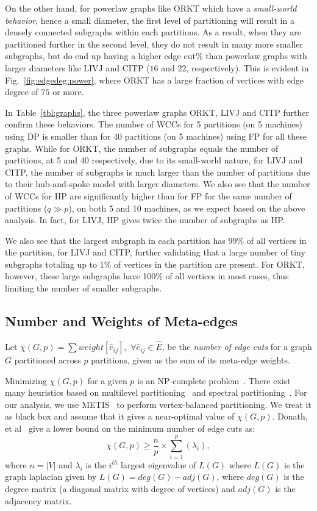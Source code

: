 \documentclass[10pt,conference, compsocconf]{IEEEtran}
\begin{document}
On the other hand, for powerlaw graphs like ORKT which have a \emph{small-world behavior}, hence a small diameter, the first level of partitioning will result in a densely connected subgraphs within each partitions. As a result, when they are partitioned further in the second level, they do not result in many more smaller subgraphs, but do end up having a higher edge cut\% than powerlaw graphs with larger diameters like LIVJ and CITP  ($16$ and $22$, respectively). This is evident in Fig.~\ref{fig:edgedeg:power}, where ORKT has a large fraction of vertices with edge degree of $75$ or more.



In Table~\ref{tbl:graphs}, the three powerlaw graphs ORKT, LIVJ and CITP further confirm these behaviors. The number of WCCs for 5 partitions (on 5 machines) using DP is smaller than for 40 partitions (on 5 machines) using FP for all these graphs. While for ORKT, the number of subgraphs equals the number of partitions, at 5 and 40 respectively, due to its small-world nature, for LIVJ and CITP, the number of subgraphs is much larger than the number of partitions due to their hub-and-spoke model with larger diameters. We also see that the number of WCCs for HP are significantly higher than for FP for the same number of partitions ($q\gg p$), on both 5 and 10 machines, as we expect based on the above analysis. In fact, for LIVJ, HP gives twice the number of subgraphs as HP. 

We also see that the largest subgraph in each partition has 99\% of all vertices in the partition, for LIVJ and CITP, further validating that a large number of tiny subgraphs totaling up to 1\% of vertices in the partition are present. For ORKT, however, these large subgraphs have 100\% of all vertices in most cases, thus limiting the number of smaller subgraphs.



\subsection{Number and Weights of Meta-edges}
Let $\chi(G, p) = \sum weight[\widehat{e}_{ij}],$ $\forall \widehat{e}_{ij}\in \widehat{E}$, be the \emph{number of edge cuts} for a graph $G$ partitioned across $p$ partitions, given as the sum of its meta-edge weights. 

Minimizing $\chi(G,p)$ for a given $p$ is an NP-complete problem~\cite{garey1974some}. There exist many heuristics based on multilevel partitioning~\cite{multilevel-part,metis} and spectral partitioning~\cite{spectral-part}. For our analysis, we use METIS~\cite{metis} to perform vertex-balanced partitioning. We treat it as black box and assume that it gives a near-optimal value of $\chi(G,p)$.
Donath, et al~\cite{donath} give a lower bound on the minimum number of edge cuts as:
\[ \chi(G,p) \geq \frac{n}{p} \times \sum_{i=1}^p(\lambda_i), \] where $n=|V|$ and $\lambda_i$ is the $i^{th}$ largest eigenvalue of $L(G)$ where $L(G)$ is the graph laplacian given by $L(G) = deg(G) - adj(G)$, where $deg(G)$ is the degree matrix (a diagonal matrix with degree of vertices) and $adj(G)$ is the adjacency matrix.
\end{document}
